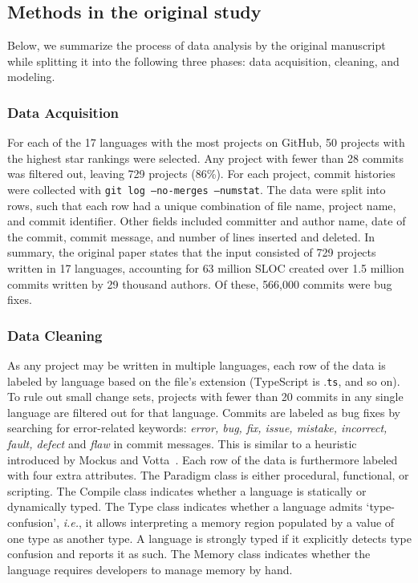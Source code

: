 \documentclass[acmsmall]{acmart}
\newcommand{\ts}{{\sf  TypeScript}\xspace}
\newcommand{\gh}{{GitHub}\xspace}
\newcommand{\code}[1]{{\tt\small #1}\xspace}
\newcommand{\ie}{\emph{i.e.}\xspace}
\begin{document}
\subsection{Methods in the original study}

Below, we summarize the process of data analysis by the original manuscript
while splitting it into the following three phases: data acquisition,
cleaning, and modeling.

\renewcommand{\SS}{\hspace{-.7mm}} 

\subsubsection{Data Acquisition}

For each of the 17 languages with the most projects on \gh, 50 projects with
the highest star rankings were selected.  Any project with fewer than 28
commits was filtered out, leaving 729 projects (86\%).  For each project,
commit histories were collected with {\tt git log --no-merges
  --numstat}. The data were split into rows, such that each row had a unique
combination of file name, project name, and commit identifier.  Other fields
included committer and author name, date of the commit, commit message, and
number of lines inserted and deleted.  In summary, the original paper states
that the input consisted of {729} projects written in {17} languages,
accounting for {63} million SLOC created over {1.5} million commits written
by {29} thousand authors. Of these, {566,000} commits were bug fixes.
  
\subsubsection{Data Cleaning}

As any project may be written in multiple languages, each row of the data is
labeled by language based on the file's extension (\ts is .\code{ts}, and so
on).  To rule out small change sets, projects with fewer than 20 commits in
any single language are filtered out for that language. Commits are labeled
as bug fixes by searching for error-related keywords: \emph{error, bug, fix,
  issue, mistake, incorrect, fault, defect} and \emph{flaw} in commit
messages. This is similar to a heuristic introduced by Mockus and
Votta~\cite{Mockus00}.  Each row of the data is furthermore labeled with
four extra attributes.  The {Paradigm} class is either procedural,
functional, or scripting. The {Compile} class indicates whether a language
is statically or dynamically typed. The {Type} class indicates whether a
language admits `type-confusion', \ie, it allows interpreting a memory
region populated by a value of one type as another type. A language is
strongly typed if it explicitly detects type confusion and reports it as
such. The {Memory} class indicates whether the language requires developers
to manage memory by hand.
\end{document}
